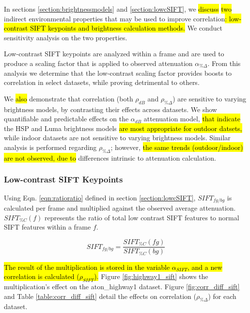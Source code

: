 In sections \ref{section:brightnessmodels} and \ref{section:lowcSIFT}, we \hl{discuss} \hl{two} indirect environmental properties that may be used to improve correlation\hl{: low-contrast SIFT keypoints and brightness calculation methods.} We conduct sensitivity analysis on the two properties.

Low-contrast SIFT keypoints are analyzed within a frame and are used to produce a scaling factor that is applied to observed attenuation $\alpha_{\%\Delta}$. From this analysis we determine that the low-contrast scaling factor provides boosts to correlation in select datasets, while proving detrimental to others.

We \hl{also} demonstrate that correlation (both $\rho_{dB}$ and $\rho_{\%\Delta}$) are sensitive to varying brightness models, by contrasting their effects across datasets. We show quantifiable and predictable effects on the $\alpha_{dB}$ attenuation model, \hl{that indicate} the HSP and Luma brightness models \hl{are most appropriate for outdoor datsets,} while indoor datasets are not sensitive to varying brightness models. Similar analysis is performed regarding $\rho_{\%\Delta}$; however, \hl{the same trends (outdoor/indoor) are not observed, due to} differences intrinsic to attenuation calculation.

\subsubsection{Low-contrast SIFT Keypoints} \label{section:lowcsensitivity}

Using Eqn. \ref{eqn:ratioratio} defined in section \ref{section:lowcSIFT}, $SIFT_{fg/bg}$ is calculated per frame and multiplied against the observed average attenuation. $SIFT_{\%C}(f)$ represents the ratio of total low contrast SIFT features to normal SIFT features within a frame $f$.

\begin{equation}
SIFT_{fg/bg} = \dfrac{SIFT_{\%C}(fg)}{SIFT_{\%C}(bg)}
\end{equation}

 \hl{The result of the multiplication is stored in the variable $\alpha_{SIFT}$, and a new correlation is calculated ($\rho_{SIFT}$).} Figure \ref{fig:highway1_sift} shows the multiplication's effect on the aton\_highway1 dataset. Figure \ref{fig:corr_diff_sift} and Table \ref{table:corr_diff_sift} detail the effects on correlation ($\rho_{\%\Delta}$) for each dataset.

